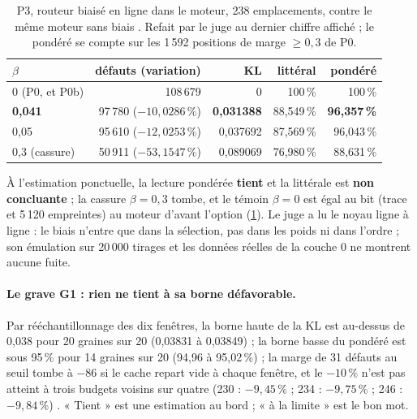 \begin{table}[tbp]
\centering\small
\caption[P3 : le routeur biaisé en ligne]{P3, routeur biaisé en ligne dans le moteur, 238 emplacements, contre le même moteur sans biais \mes. Refait par le juge au dernier chiffre affiché ; le pondéré se compte sur les 1\,592 positions de marge $\ge 0{,}3$ de P0.}
\label{t3mim:tab:p3-ligne}
\begin{tabular}{@{}lrrrr@{}}
\toprule
$\beta$ & défauts (variation) & KL & littéral & pondéré \\
\midrule
0 (P0, et P0b) & 108\,679 & 0 & 100\,\% & 100\,\% \\
\textbf{0,041} & 97\,780 ($-10{,}0286\,\%$) & \textbf{0,031388} & 88,549\,\% & \textbf{96,357\,\%} \\
0,05 & 95\,610 ($-12{,}0253\,\%$) & 0,037692 & 87,569\,\% & 96,043\,\% \\
0,3 (cassure) & 50\,911 ($-53{,}1547\,\%$) & 0,089069 & 76,980\,\% & 88,631\,\% \\
\bottomrule
\end{tabular}
\end{table}

À l'estimation ponctuelle, la lecture pondérée \textbf{tient} et la littérale est \textbf{non concluante} ; la cassure $\beta = 0{,}3$ tombe, et le témoin $\beta = 0$ est égal au bit (trace et 5\,120 empreintes) au moteur d'avant l'option (\cref{t3mim:tab:p3-ligne}). Le juge a lu le noyau ligne à ligne : le biais n'entre que dans la sélection, pas dans les poids ni dans l'ordre ; son émulation sur 20\,000 tirages et les données réelles de la couche 0 ne montrent aucune fuite.

\paragraph{Le grave G1 : rien ne tient à sa borne défavorable.} Par rééchantillonnage des dix fenêtres, la borne haute de la KL est au-dessus de 0,038 pour 20 graines sur 20 (0,03831 à 0,03849) ; la borne basse du pondéré est sous 95\,\% pour 14 graines sur 20 (94,96 à 95,02\,\%) ; la marge de 31 défauts au seuil tombe à $-86$ si le cache repart vide à chaque fenêtre, et le $-10\,\%$ n'est pas atteint à trois budgets voisins sur quatre (230 : $-9{,}45\,\%$ ; 234 : $-9{,}75\,\%$ ; 246 : $-9{,}84\,\%$) \mes. « Tient » est une estimation au bord ; « à la limite » est le bon mot.

